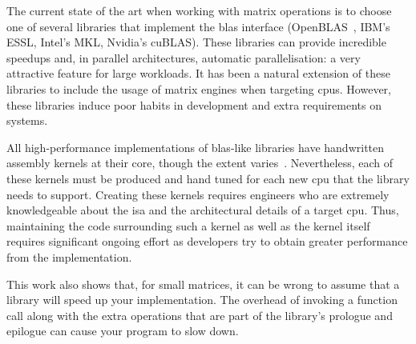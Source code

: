 \documentclass[\main/thesis.tex]{subfiles}
\begin{document}
The current state of the art when working with matrix operations is to choose one of several libraries that implement the \gls{blas} interface (\eg OpenBLAS~\autocite{2012xianyi}, IBM's ESSL, Intel's MKL, Nvidia's cuBLAS).
These libraries can provide incredible speedups and, in parallel architectures, automatic parallelisation: a very attractive feature for large workloads.
It has been a natural extension of these libraries to include the usage of matrix engines when targeting \glspl{cpu}.
However, these libraries induce poor habits in development and extra requirements on systems.

All high-performance implementations of \gls{blas}-like libraries have handwritten assembly kernels at their core, though the extent varies~\autocite{zee2016blis}.
Nevertheless, each of these kernels must be produced and hand tuned for each new \gls{cpu} that the library needs to support.
Creating these kernels requires engineers who are extremely knowledgeable about the \gls{isa} and the architectural details of a target \gls{cpu}.
Thus, maintaining the code surrounding such a kernel as well as the kernel itself requires significant ongoing effort as developers try to obtain greater performance from the implementation.

This work also shows that, for small matrices, it can be wrong to assume that a library will speed up your implementation.
The overhead of invoking a function call along with the extra operations that are part of the library's prologue and epilogue can cause your program to slow down.
\end{document}
